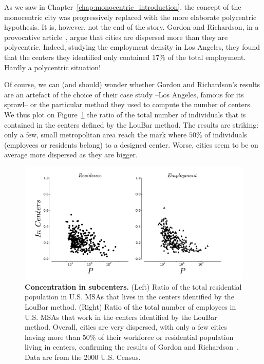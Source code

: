 As we saw in Chapter~\ref{chap:monocentric_introduction}, the concept of the
monocentric city was progressively replaced with the more elaborate polycentric hypothesis. It
is, however, not the end of the story. Gordon and Richardson, in a
provocative article~\cite{Gordon:1996}, argue that cities are dispersed more
than they are polycentric. Indeed, studying the employment density in Los Angeles,
they found that the centers they identified only contained $17\%$
of the total employment. Hardly a polycentric situation!  

Of course, we can (and should) wonder whether Gordon and Richardson's results
are an artefact of the choice of their case study --Los Angeles, famous for its
sprawl-- or the particular method they used to compute the number of centers. We
thus plot on Figure~\ref{fig:concentration_loubar} the ratio of the total number
of individuals that is contained in the centers defined by the LouBar method.
The results are striking: only a few, small metropolitan area reach the mark
where $50\%$ of individuals (employees or residents belong) to a designed
center. Worse, cities seem to be on average more dispersed as they are bigger.\\

\begin{figure}
    \centering
    \includegraphics[width=1\textwidth]{gfx/chapter-monocentric/concentration_loubar.pdf}
    \caption{{\bf Concentration in subcenters.} (Left) Ratio of the total
    residential population in U.S. MSAs that lives in the centers identified by the LouBar
method. (Right) Ratio of the total number of employees in U.S. MSAs that work in the centers
identified by the LouBar method. Overall, cities are very dispersed, with only a
few cities having more than $50\%$ of their workforce or residential population
living in centers, confirming the results of Gordon and
Richardson~\cite{Gordon:1996}. Data are from the 2000 U.S.
Census.\label{fig:concentration_loubar}}
\end{figure}

